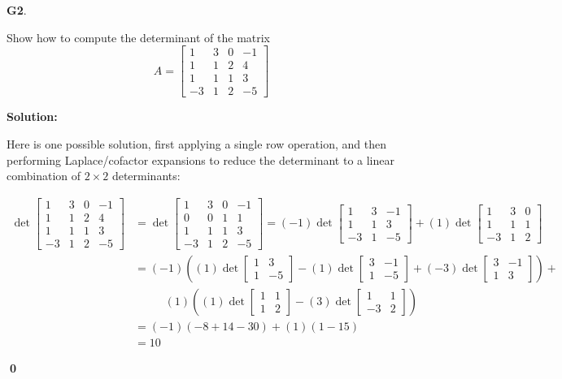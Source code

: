 \documentclass{article}
\newenvironment{problem}[1]
{
  \begin{flushleft}
  \textbf{#1}.
  \ignorespaces
}
{
  \end{flushleft}
}
\newenvironment{solution}
{
  \ignorespaces
  \textbf{Solution:}
}
{
  \ignorespacesafterend
  \begin{flushright}
  {\bfseries \qed}
  \end{flushright}
}
\begin{document}
\begin{problem}{G2}
Show how to compute the determinant of the matrix
\[
  A
    =
  \begin{bmatrix}
    1 & 3 & 0 & -1 \\
    1 & 1 & 2 & 4 \\
    1 & 1 & 1 & 3 \\
    -3 & 1 & 2 & -5
  \end{bmatrix}
\]
\end{problem}
\begin{solution}
Here is one possible solution, first applying a single row operation,
 and then performing Laplace/cofactor expansions to reduce the determinant
 to a linear combination of \(2\times 2\) determinants:

 \begin{align*}
\det
   \begin{bmatrix}
     1 & 3 & 0 & -1 \\
     1 & 1 & 2 & 4 \\
     1 & 1 & 1 & 3 \\
     -3 & 1 & 2 & -5
   \end{bmatrix}
 &= \det \begin{bmatrix} 1 & 3 & 0 & -1 \\ 0 & 0 & 1 & 1 \\ 1 & 1 & 1 & 3 \\ -3 & 1 & 2 & -5 \end{bmatrix} =
 (-1) \det \begin{bmatrix} 1 & 3 & -1 \\ 1 & 1 & 3 \\ -3 & 1 & -5 \end{bmatrix} + (1) \det \begin{bmatrix} 1 & 3 & 0 \\ 1 & 1 & 1 \\ -3 & 1 & 2 \end{bmatrix} \\
 &= (-1) \left( (1) \det \begin{bmatrix} 1 & 3 \\ 1 & -5 \end{bmatrix} - (1) \det \begin{bmatrix} 3 & -1 \\ 1 & -5 \end{bmatrix} + (-3) \det \begin{bmatrix} 3 & -1 \\ 1 & 3 \end{bmatrix} \right) + \\
 &\phantom{==} (1) \left( (1) \det \begin{bmatrix} 1 & 1 \\ 1 & 2 \end{bmatrix} - (3) \det \begin{bmatrix} 1 & 1 \\ -3 & 2 \end{bmatrix} \right) \\
 &= (-1) \left( -8+14-30 \right) + (1) \left(1-15 \right) \\
 &=10
 \end{align*}


\end{solution}
\end{document}
